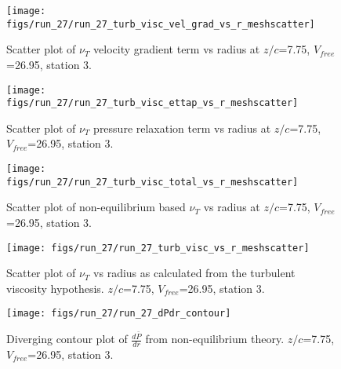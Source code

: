 \begin{figure}[H]
\centering
\texttt{[image: figs/run\_27/run\_27\_turb\_visc\_vel\_grad\_vs\_r\_meshscatter]}
\caption{Scatter plot of $\nu_T$ velocity gradient term vs radius at $z/c$=7.75, $V_{free}$=26.95, station 3.}
\end{figure}


\begin{figure}[H]
\centering
\texttt{[image: figs/run\_27/run\_27\_turb\_visc\_ettap\_vs\_r\_meshscatter]}
\caption{Scatter plot of $\nu_T$ pressure relaxation term vs radius at $z/c$=7.75, $V_{free}$=26.95, station 3.}
\end{figure}


\begin{figure}[H]
\centering
\texttt{[image: figs/run\_27/run\_27\_turb\_visc\_total\_vs\_r\_meshscatter]}
\caption{Scatter plot of non-equilibrium based $\nu_T$ vs radius at $z/c$=7.75, $V_{free}$=26.95, station 3.}
\end{figure}


\begin{figure}[H]
\centering
\texttt{[image: figs/run\_27/run\_27\_turb\_visc\_vs\_r\_meshscatter]}
\caption{Scatter plot of $\nu_T$ vs radius as calculated from the turbulent viscosity hypothesis. $z/c$=7.75, $V_{free}$=26.95, station 3.}
\end{figure}


\begin{figure}[H]
\centering
\texttt{[image: figs/run\_27/run\_27\_dPdr\_contour]}
\caption{Diverging contour plot of $\frac{d\bar{P}}{dr}$ from non-equilibrium theory. $z/c$=7.75, $V_{free}$=26.95, station 3.}
\end{figure}



